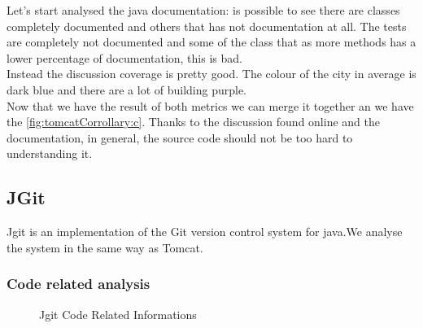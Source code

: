 \documentclass[]{usiinfbachelorproject}
\begin{document}
Let's start analysed the java documentation:  is possible to see there are classes completely documented and others that has not documentation at all. The tests are completely not documented and some of the class that as more methods has a lower percentage of documentation, this is bad.\\
Instead the discussion coverage is pretty good. The colour of the city in average is dark blue and there are a lot of building purple.\\
Now that we have the result of both metrics we can merge it together an we have the  \ref{fig:tomcatCorrollary:c}. Thanks to the discussion found online and the documentation, in general, the source code should not be too hard to understanding it.
 

  









\newpage
\subsection{JGit}
Jgit is an implementation of the Git version control system for java.We analyse the system in the same way as Tomcat.
\subsubsection{Code related analysis}


\begin{figure}[h]
\hspace*{\fill}


\caption{Jgit Code Related Informations \label{fig:jgitRel}
}
\end{figure}
\end{document}
